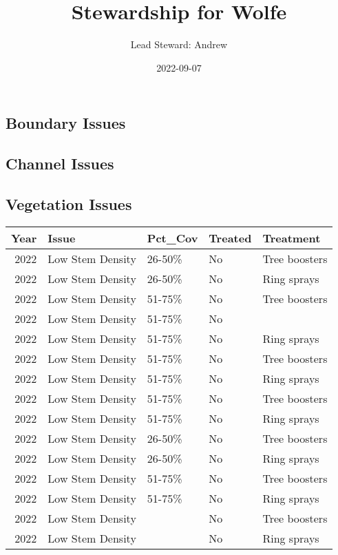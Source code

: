\documentclass[
]{article}
\title{Stewardship for Wolfe}
\author{Lead Steward: Andrew}
\date{2022-09-07}
\begin{document}
\maketitle

\hypertarget{boundary-issues}{%
\subsection{Boundary Issues}\label{boundary-issues}}

\textbar\textbar{} \textbar\textbar{} \textbar\textbar{}
\textbar\textbar{}

\hypertarget{channel-issues}{%
\subsection{Channel Issues}\label{channel-issues}}

\textbar\textbar{} \textbar\textbar{} \textbar\textbar{}
\textbar\textbar{}

\hypertarget{vegetation-issues}{%
\subsection{Vegetation Issues}\label{vegetation-issues}}

\begin{longtable}[]{@{}rllll@{}}
\toprule()
Year & Issue & Pct\_Cov & Treated & Treatment \\
\midrule()
\endhead
2022 & Low Stem Density & 26-50\% & No & Tree boosters \\
2022 & Low Stem Density & 26-50\% & No & Ring sprays \\
2022 & Low Stem Density & 51-75\% & No & Tree boosters \\
2022 & Low Stem Density & 51-75\% & No & \\
2022 & Low Stem Density & 51-75\% & No & Ring sprays \\
2022 & Low Stem Density & 51-75\% & No & Tree boosters \\
2022 & Low Stem Density & 51-75\% & No & Ring sprays \\
2022 & Low Stem Density & 51-75\% & No & Tree boosters \\
2022 & Low Stem Density & 51-75\% & No & Ring sprays \\
2022 & Low Stem Density & 26-50\% & No & Tree boosters \\
2022 & Low Stem Density & 26-50\% & No & Ring sprays \\
2022 & Low Stem Density & 51-75\% & No & Tree boosters \\
2022 & Low Stem Density & 51-75\% & No & Ring sprays \\
2022 & Low Stem Density & & No & Tree boosters \\
2022 & Low Stem Density & & No & Ring sprays \\
\bottomrule()
\end{longtable}
\end{document}
